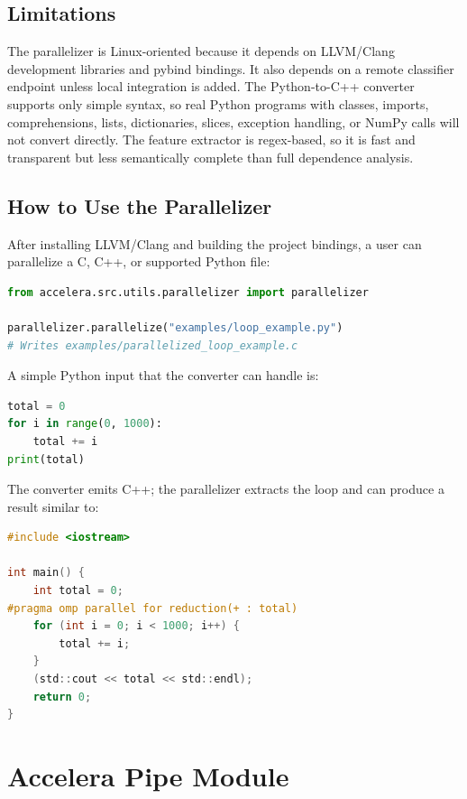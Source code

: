 \documentclass[11pt,a4paper]{article}
\begin{document}
\subsection{Limitations}

The parallelizer is Linux-oriented because it depends on LLVM/Clang
development libraries and pybind bindings. It also depends on a remote
classifier endpoint unless local integration is added. The Python-to-C++
converter supports only simple syntax, so real Python programs with classes,
imports, comprehensions, lists, dictionaries, slices, exception handling, or
NumPy calls will not convert directly. The feature extractor is regex-based,
so it is fast and transparent but less semantically complete than full
dependence analysis.

\subsection{How to Use the Parallelizer}

After installing LLVM/Clang and building the project bindings, a user can
parallelize a C, C++, or supported Python file:

\begin{lstlisting}[language=Python]
from accelera.src.utils.parallelizer import parallelizer

parallelizer.parallelize("examples/loop_example.py")
# Writes examples/parallelized_loop_example.c
\end{lstlisting}

A simple Python input that the converter can handle is:

\begin{lstlisting}[language=Python]
total = 0
for i in range(0, 1000):
    total += i
print(total)
\end{lstlisting}

The converter emits C++; the parallelizer extracts the loop and can produce a
result similar to:

\begin{lstlisting}[language=C]
#include <iostream>

int main() {
    int total = 0;
#pragma omp parallel for reduction(+ : total)
    for (int i = 0; i < 1000; i++) {
        total += i;
    }
    (std::cout << total << std::endl);
    return 0;
}
\end{lstlisting}

\iffalse
\section{Accelera Pipe Module}
\end{document}
